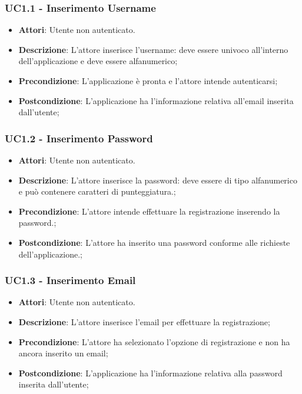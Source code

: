 \subsubsection{UC1.1 - Inserimento Username} 
\label{sssec:UC1.1} 
\begin{itemize} 
\item \textbf{Attori}: Utente non autenticato.
\item \textbf{Descrizione}: L’attore inserisce l'username: deve essere univoco all'interno dell'applicazione e deve essere alfanumerico;
\item \textbf{Precondizione}: L'applicazione è pronta e l'attore intende autenticarsi;
\item \textbf{Postcondizione}: L'applicazione ha l’informazione relativa all'email inserita dall’utente;
\end{itemize} 
\subsubsection{UC1.2 - Inserimento Password} 
\label{sssec:UC1.2} 
\begin{itemize} 
\item \textbf{Attori}: Utente non autenticato.
\item \textbf{Descrizione}: L’attore inserisce la password: deve essere di tipo alfanumerico e può contenere caratteri di punteggiatura.;
\item \textbf{Precondizione}: L'attore intende effettuare la registrazione inserendo la password.;
\item \textbf{Postcondizione}: L'attore ha inserito una password conforme alle richieste dell'applicazione.;
\end{itemize} 
\subsubsection{UC1.3 - Inserimento Email} 
\label{sssec:UC1.3} 
\begin{itemize} 
\item \textbf{Attori}: Utente non autenticato.
\item \textbf{Descrizione}: L’attore inserisce l'email per effettuare la registrazione;
\item \textbf{Precondizione}: L'attore ha selezionato l'opzione di registrazione e non ha ancora inserito un email;
\item \textbf{Postcondizione}: L'applicazione ha l’informazione relativa alla password inserita dall’utente;
\end{itemize} 
